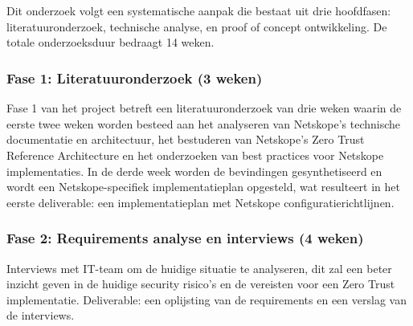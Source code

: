 
\chapter{}%
\label{ch:methodologie}


Dit onderzoek volgt een systematische aanpak die bestaat uit drie hoofdfasen: literatuuronderzoek, technische analyse, en proof of concept ontwikkeling. De totale onderzoeksduur bedraagt 14 weken.

\subsection{Fase 1: Literatuuronderzoek (3 weken)}
Fase 1 van het project betreft een literatuuronderzoek van drie weken waarin de eerste twee weken worden besteed aan het analyseren van Netskope’s technische documentatie en architectuur, het bestuderen van Netskope’s Zero Trust Reference Architecture en het onderzoeken van best practices voor Netskope implementaties. 
In de derde week worden de bevindingen gesynthetiseerd en wordt een Netskope-specifiek implementatieplan opgesteld, wat resulteert in het eerste deliverable: een implementatieplan met Netskope configuratierichtlijnen.

\subsection{Fase 2: Requirements analyse en interviews (4 weken)}
Interviews met IT-team om de huidige situatie te analyseren, dit zal een beter inzicht geven in de huidige security risico's en de vereisten voor een Zero Trust implementatie. Deliverable: een oplijsting van de requirements en een
verslag van de interviews.

